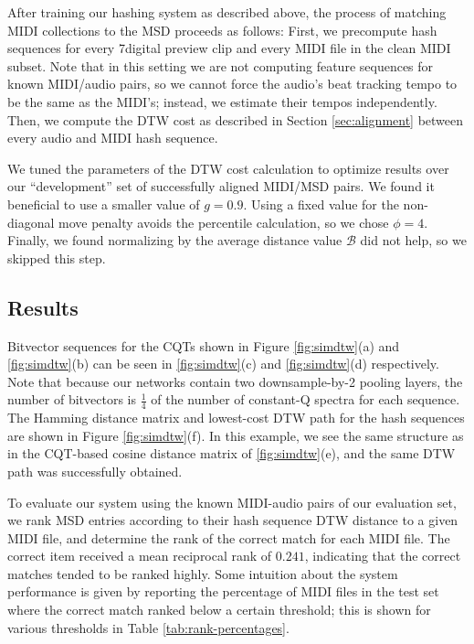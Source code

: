\documentclass{article}
\begin{document}
After training our hashing system as described above, the process of matching MIDI collections to the MSD proceeds as follows:
First, we precompute hash sequences for every 7digital preview clip and every MIDI file in the clean MIDI subset.
Note that in this setting we are not computing feature sequences for known MIDI/audio pairs, so we cannot force the audio's beat tracking tempo to be the same as the MIDI's; instead, we estimate their tempos independently.
Then, we compute the DTW cost as described in Section \ref{sec:alignment} between every audio and MIDI hash sequence.

We tuned the parameters of the DTW cost calculation to optimize results over our ``development'' set of successfully aligned MIDI/MSD pairs.
We found it beneficial to use a smaller value of $g = 0.9$.
Using a fixed value for the non-diagonal move penalty avoids the percentile calculation, so we chose $\phi = 4$.
Finally, we found normalizing by the average distance value $\mathcal{B}$ did not help, so we skipped this step.

\subsection{Results}

Bitvector sequences for the CQTs shown in Figure \ref{fig:simdtw}(a) and \ref{fig:simdtw}(b) can be seen in \ref{fig:simdtw}(c) and \ref{fig:simdtw}(d) respectively.
Note that because our networks contain two downsample-by-2 pooling layers, the number of bitvectors is $\frac{1}{4}$ of the number of constant-Q spectra for each sequence.
The Hamming distance matrix and lowest-cost DTW path for the hash sequences are shown in Figure \ref{fig:simdtw}(f).
In this example, we see the same structure as in the CQT-based cosine distance matrix of  \ref{fig:simdtw}(e), and the same DTW path was successfully obtained.

To evaluate our system using the known MIDI-audio pairs of our evaluation set, we rank MSD entries according to their hash sequence DTW distance to a given MIDI file, and determine the rank of the correct match for each MIDI file.
The correct item received a mean reciprocal rank of \textbf{$0.241$}, indicating that the correct matches tended to be ranked highly.  
Some intuition about the system performance is given by reporting the percentage of MIDI files in the test set where the correct match ranked below a certain threshold; this is shown for various thresholds in Table \ref{tab:rank-percentages}.
\end{document}
